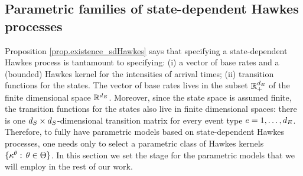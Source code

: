 \documentclass[10pt, article,table]{article}
\begin{document}
\subsection{Parametric families of state-dependent Hawkes processes}\label{sec.parametric_hawkes}
Proposition \ref{prop.existence_sdHawkes} says that specifying a state-dependent Hawkes process is tantamount to specifying: (i) a vector of base rates and a (bounded) Hawkes kernel for the intensities of arrival times; (ii) transition functions for the states. The vector of base rates lives in the subset $\mathbb{R}_{+}^{d_{E}}$ of the finite dimensional space $\mathbb{R}^{d_{E}}$. Moreover, since the state space is assumed finite, the transition functions for the states also live in finite dimensional spaces: there is one $d_{S}\times d_{S}$-dimensional transition matrix for every event type $e=1,\dots, d_{E}$. Therefore, to fully have parametric models based on state-dependent Hawkes processes, one needs only to select a parametric class of Hawkes kernels $\lbrace\kappa^\theta : \, \theta \in \Theta \rbrace$. In this section we set the stage for the parametric models that we will employ in the rest of our work. 
\end{document}
